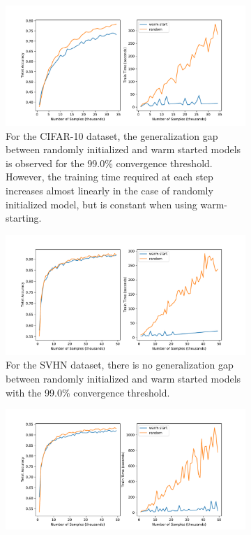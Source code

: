 \begin{figure}
    \begin{subfigure}[t]{0.45\textwidth}
         \centering
         \includegraphics[trim=45 0 71 0,clip,width=\textwidth]{figures/figure2-cifar10-99_0.pdf}
         \caption{For the CIFAR-10 dataset, the generalization gap between randomly initialized and warm started models is observed for the 99.0\% convergence threshold. However, the training time required at each step increases almost linearly in the case of randomly initialized model, but is constant when using warm-starting.}
         \label{fig:fig2-cifar10}
     \end{subfigure}
     \hfill
     \begin{subfigure}[t]{0.225\textwidth}
         \centering
         \includegraphics[trim=45 0 375 0,clip,width=\textwidth]{figures/figure2-svhn-99_0.pdf}
         \caption{For the SVHN dataset, there is no generalization gap between randomly initialized and warm started models with the 99.0\% convergence threshold. }
         \label{fig:fig2-svhn}
     \end{subfigure}
     \hfill
     \begin{subfigure}[t]{0.225\textwidth}
         \centering
         \includegraphics[trim=45 0 375 0,clip,width=\textwidth]{figures/figure2-svhn-99_9.pdf}

\end{subfigure}
\end{figure}
